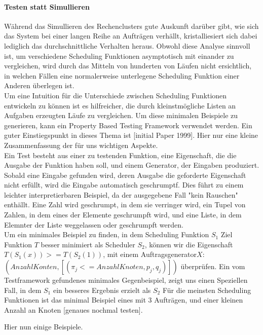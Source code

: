 \paragraph{Testen statt Simullieren}
Während das Simullieren des Rechenclusters gute Auskunft darüber gibt, wie sich das System bei einer langen Reihe an Aufträgen verhällt, kristalliesiert sich dabei lediglich das durchschnittliche Verhalten heraus. Obwohl diese Analyse sinnvoll ist, um verschiedene Scheduling Funktionen asymptotisch mit einander zu vergleichen, wird durch das Mitteln von hunderten von Läufen nicht ersichtlich, in welchen Fällen eine normalerweise unterlegene Scheduling Funktion einer Anderen überlegen ist.\\
Um eine Intuition für die Unterschiede zwischen Scheduling Funktionen entwickeln zu können ist es hilfreicher, die durch kleinstmögliche Listen an Aufgaben erzeugten Läufe zu vergleichen. Um diese minimalen Beispiele zu generieren, kann ein Property Based Testing Framework verwendet werden. Ein guter Einstiegspunkt in dieses Thema ist [initial Paper 1999]. Hier nur eine kleine Zusammenfassung der für uns wichtigen Aspekte. \\
Ein Test besteht aus einer zu testenden Funktion, eine Eigenschaft, die die Ausgabe der Funktion haben soll, und einem Generator, der Eingaben produziert. Sobald eine Eingabe gefunden wird, deren Ausgabe die geforderte Eigenschaft nicht erfüllt, wird die Eingabe automatisch geschrumptf. Dies führt zu einem leichter interpretierbaren Beispiel, da der ausgegebene Fall "kein Rauschen" enthällt.
Eine Zahl wird geschrumpt, in dem sie verringer wird, ein Tupel von Zahlen, in dem eines der Elemente geschrumpft wird, und eine Liste, in dem Elemnter der Liste weggelassen oder geschrumpft werden.\\
Um ein minimales Beispiel zu finden, in dem Scheduling Funktion $S_1$ Ziel Funktion $T$ besser minimiert als Scheduler $S_2$, können wir die Eigenschaft $T(S_1(x)) >= T (S_2(1))$, mit einem Auftragsgenerator$X$: $(Anzahl Konten,[(\pi_j <= Anzahl Knoten,p_j,q_j)])$ überprüfen.
Ein vom Testframework gefundenes minimales Gegenbeispiel, zeigt uns einen Speziellen Fall, in dem $S_1$ ein besseres Ergebnis erzielt als $S_2$
Für die meinsten Scheduling Funktionen ist das minimal Beispiel eines mit 3 Aufträgen, und einer kleinen Anzahl an Knoten [genaues nochmal testen].

Hier nun einige Beispiele.

